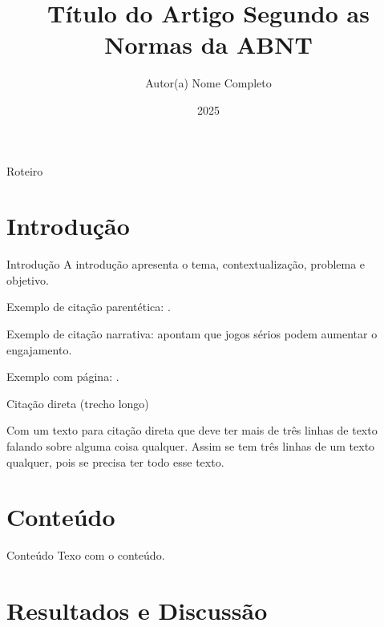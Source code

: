 \documentclass[aspectratio=169]{beamer}
\title{Título do Artigo Segundo as Normas da ABNT}
\author{Autor(a) Nome Completo}
\institute{Instituição\\ \href{mailto:autor@exemplo.com}{autor@exemplo.com}}
\date{2025}
\begin{document}
\begin{frame}
  \titlepage
\end{frame}

\begin{frame}{Roteiro}
  \tableofcontents
\end{frame}

\section{Introdução}

\begin{frame}{Introdução}
A introdução apresenta o tema, contextualização, problema e objetivo.

Exemplo de citação parentética: \parencite{albuquerqueToyUserInterfaces2021}.

Exemplo de citação narrativa: \textcite{aragaoEnsinoProgramacaoPensamento2023}
apontam que jogos sérios podem aumentar o engajamento.

Exemplo com página: \parencite[p.~25]{azumaRecentAdvancesAugmentedReality2001}.
\end{frame}

\begin{frame}{Citação direta (trecho longo)}
\small
\begin{displayquote}
Com um texto para citação direta que deve ter mais de três linhas de texto
falando sobre alguma coisa qualquer. Assim se tem três linhas de um texto
qualquer, pois se precisa ter todo esse texto.
\end{displayquote}
\end{frame}

\section{Conteúdo}

\begin{frame}{Conteúdo}
Texo com o conteúdo.
\end{frame}

\section{Resultados e Discussão}
\end{document}
